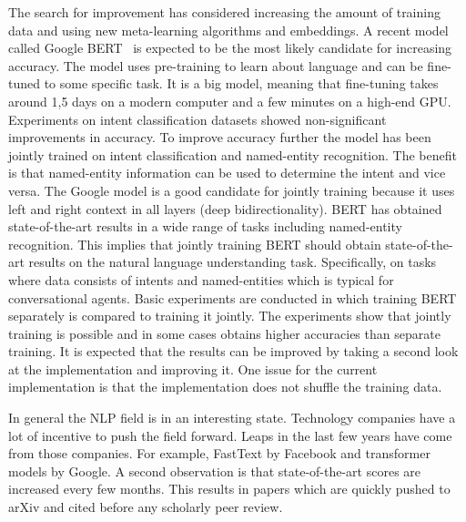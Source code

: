 The search for improvement has considered increasing the amount of training data and using new meta-learning algorithms and embeddings.
A recent model called Google BERT~\citep{devlin2018} is expected to be the most likely candidate for increasing accuracy.
The model uses pre-training to learn about language and can be fine-tuned to some specific task.
It is a big model, meaning that fine-tuning takes around 1,5 days on a modern computer and a few minutes on a high-end GPU.
Experiments on intent classification datasets showed non-significant improvements in accuracy.
To improve accuracy further the model has been jointly trained on intent classification and named-entity recognition.
The benefit is that named-entity information can be used to determine the intent and vice versa.
The Google model is a good candidate for jointly training because it uses left and right context in all layers (deep bidirectionality).
BERT has obtained state-of-the-art results in a wide range of tasks including named-entity recognition.
This implies that jointly training BERT should obtain state-of-the-art results on the natural language understanding task.
Specifically, on tasks where data consists of intents and named-entities which is typical for conversational agents.
Basic experiments are conducted in which training BERT separately is compared to training it jointly.
The experiments show that jointly training is possible and in some cases obtains higher accuracies than separate training.
It is expected that the results can be improved by taking a second look at the implementation and improving it.
One issue for the current implementation is that the implementation does not shuffle the training data.

In general the NLP field is in an interesting state.
Technology companies have a lot of incentive to push the field forward.
Leaps in the last few years have come from those companies.
For example, FastText by Facebook and transformer models by Google.
A second observation is that state-of-the-art scores are increased every few months.
This results in papers which are quickly pushed to arXiv and cited before any scholarly peer review.

